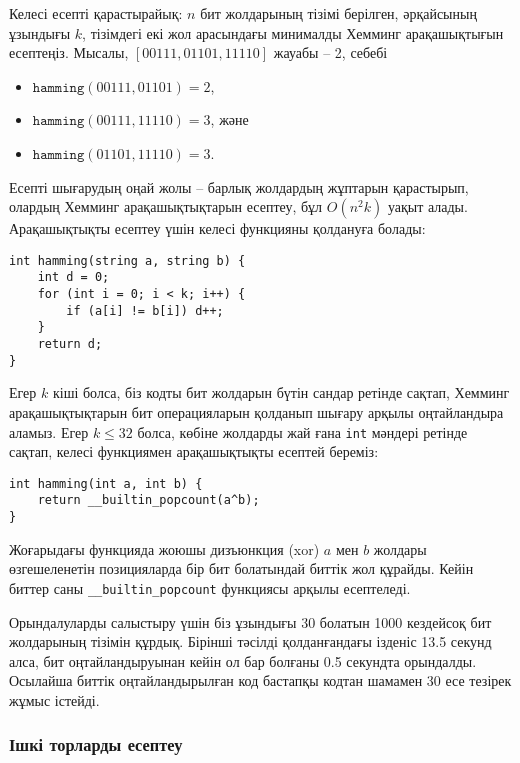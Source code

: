 Келесі есепті қарастырайық:
$n$ бит жолдарының тізімі берілген, әрқайсының ұзындығы $k$,
тізімдегі екі жол арасындағы минималды Хемминг арақашықтығын 
есептеңіз.
Мысалы, $[00111,01101,11110]$ жауабы -- 2, себебі 
\begin{itemize}[noitemsep]
\item $\texttt{hamming}(00111,01101)=2$,
\item $\texttt{hamming}(00111,11110)=3$, және
\item $\texttt{hamming}(01101,11110)=3$.
\end{itemize}

Есепті шығарудың оңай жолы -- барлық жолдардың жұптарын қарастырып,
олардың Хемминг арақашықтықтарын есептеу, бұл $O(n^2 k)$ уақыт алады.
Арақашықтықты есептеу үшін келесі функцияны қолдануға болады:
\begin{lstlisting}
int hamming(string a, string b) {
    int d = 0;
    for (int i = 0; i < k; i++) {
        if (a[i] != b[i]) d++;
    }
    return d;
}
\end{lstlisting}

Егер $k$ кіші болса, біз кодты бит жолдарын 
бүтін сандар ретінде сақтап, Хемминг арақашықтықтарын 
бит операцияларын қолданып шығару арқылы оңтайландыра аламыз.
Егер $k \le 32$ болса, көбіне жолдарды жай ғана \texttt{int} мәндері 
ретінде сақтап, келесі функциямен арақашықтықты есептей береміз:
\begin{lstlisting}
int hamming(int a, int b) {
    return __builtin_popcount(a^b);
}
\end{lstlisting}
Жоғарыдағы функцияда жоюшы дизъюнкция (xor) $a$ мен $b$
жолдары өзгешеленетін позицияларда бір бит болатындай
биттік жол құрайды. Кейін биттер саны 
\texttt{\_\_builtin\_popcount} функциясы арқылы есептеледі.

Орындалуларды салыстыру үшін біз ұзындығы 30
болатын 1000 кездейсоқ бит жолдарының тізімін құрдық. Бірінші тәсілді қолданғандағы
ізденіс 13.5 секунд алса, бит оңтайландыруынан кейін ол бар болғаны 0.5 секундта орындалды. Осылайша биттік оңтайландырылған код бастапқы кодтан
шамамен 30 есе тезірек жұмыс істейді.

\subsubsection{Ішкі торларды есептеу}

